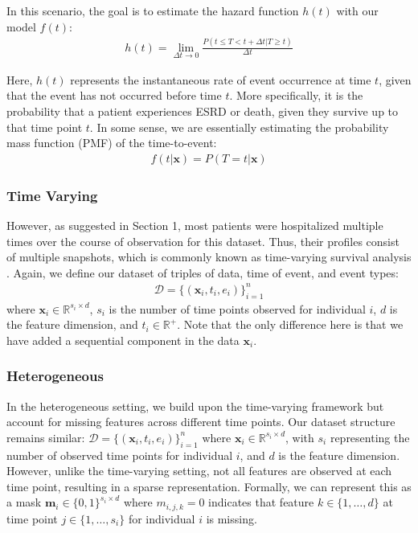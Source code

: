 In this scenario, the goal is to estimate the hazard function $h(t)$ with our model $f(t)$:
\begin{align}
h(t) = \lim_{\Delta t \to 0} \frac{P(t \leq T < t + \Delta t | T \geq t)}{\Delta t}
\end{align}

Here, $h(t)$ represents the instantaneous rate of event occurrence at time $t$, given that the event has not occurred before time $t$. More specifically, it is the probability that a patient experiences ESRD or death, given they survive up to that time point $t$. In some sense, we are essentially estimating the probability mass function (PMF) of the time-to-event:
\begin{align}
f(t | \boldsymbol{x}) = P(T = t | \boldsymbol{x})
\end{align}

\subsubsection{Time Varying}
However, as suggested in Section 1, most patients were hospitalized multiple times over the course of observation for this dataset. Thus, their profiles consist of multiple snapshots, which is commonly known as time-varying survival analysis \citep{zhang2018time_variant_surv_analysis}. Again, we define our dataset of triples of data, time of event, and event types:
\begin{align}
\mathcal{D} = \{(\boldsymbol{x}_i, t_i, e_i)\}_{i=1}^n
\end{align}
where $\boldsymbol{x}_i \in \mathbb{R}^{s_i \times d}$, $s_i$ is the number of time points observed for individual $i$, $d$ is the feature dimension, and $t_i \in \mathbb{R}^+$. Note that the only difference here is that we have added a sequential component in the data $\boldsymbol{x}_i$.

\subsubsection{Heterogeneous} \label{sec: Heterogeneous}
In the heterogeneous setting, we build upon the time-varying framework but account for missing features across different time points. Our dataset structure remains similar:
$\mathcal{D} = \{(\boldsymbol{x}_i, t_i, e_i)\}_{i=1}^n$
where $\boldsymbol{x}_i \in \mathbb{R}^{s_i \times d}$, with $s_i$ representing the number of observed time points for individual $i$, and $d$ is the feature dimension. However, unlike the time-varying setting, not all features are observed at each time point, resulting in a sparse representation. Formally, we can represent this as a mask $\boldsymbol{m}_i \in \{0,1\}^{s_i \times d}$ where $m_{i,j,k} = 0$ indicates that feature $k \in \{1, \dots, d\}$ at time point $j \in \{1, \dots, s_i\}$ for individual $i$ is missing.

